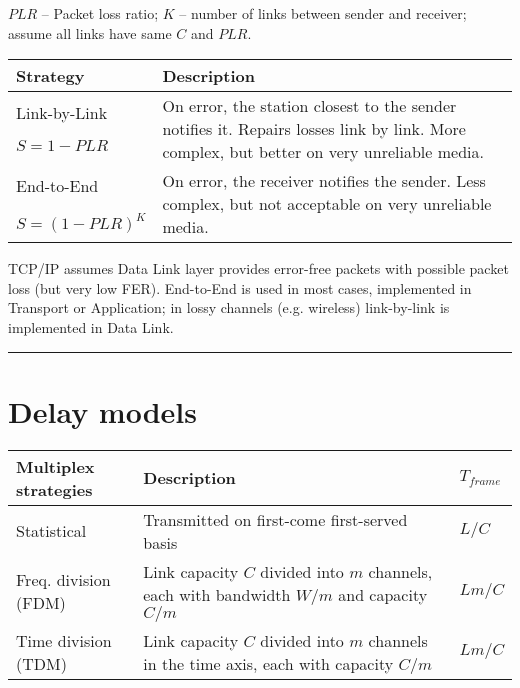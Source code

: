 \documentclass{form}
\begin{document}
\begin{minipage}[c]{0.58\textwidth}
    $PLR$ -- Packet loss ratio; $K$ -- number of links between sender and receiver; assume all links have same $C$ and $PLR$.
    \begin{center}
        \begin{tabular}{@{}p{24mm} | l@{}}
            \textbf{Strategy} & \textbf{Description} \\ \hline
            Link-by-Link & \multirow{3}{24.0em}{On error, the station closest to the sender notifies it. Repairs losses link by link. More complex, but better on very unreliable media.} \\
            $S=1-PLR$ \\
            \\
            End-to-End   & \multirow{2}{24.0em}{On error, the receiver notifies the sender. Less complex, but not acceptable on very unreliable media.} \\
            $S=(1-PLR)^K$ \\
        \end{tabular}
    \end{center}

    TCP/IP assumes Data Link layer provides error-free packets with possible packet loss (but very low FER).
    End-to-End is used in most cases, implemented in Transport or Application;
    in lossy channels (e.g. wireless) link-by-link is implemented in Data Link. 
\end{minipage}

\vspace{-0em}\rule{\textwidth}{1.0pt}\vspace{-0em}

\begin{minipage}{0.1\textwidth}
    \section*{Delay models}
\end{minipage}%
\begin{minipage}{0.9\textwidth}
    \begin{tabular}{@{}l | l | l@{}}
        \textbf{Multiplex strategies}        & \textbf{Description}                                                                      & $T_{frame}$ \\ \hline
        Statistical              & Transmitted on first-come first-served basis                                              & $L/C$       \\ \hline
        Freq. division (FDM) & Link capacity $C$ divided into $m$ channels, each with bandwidth $W/m$ and capacity $C/m$ & $Lm/C$      \\ \hline
        Time division (TDM)      & Link capacity $C$ divided into $m$ channels in the time axis, each with capacity $C/m$    & $Lm/C$      \\
    \end{tabular}
\end{minipage}
\end{document}
